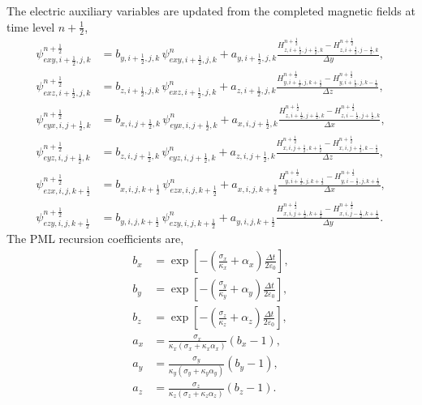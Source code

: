 \documentclass{article}
\numberwithin{equation}{section}
\numberwithin{figure}{section}
\begin{document}
The electric auxiliary variables are updated from the completed magnetic fields at time level $n+\tfrac12$,
\begin{subequations}\label{eq:first-pml-aux-e}
    \begin{align}
        \psi_{exy,i+\tfrac12,j,k}^{n+\frac12} & = b_{y,i+\tfrac12,j,k}\,\psi_{exy,i+\tfrac12,j,k}^{n} +a_{y,i+\tfrac12,j,k} \frac{H_{z,i+\tfrac12,j+\tfrac12,k}^{n+\frac12}-H_{z,i+\tfrac12,j-\tfrac12,k}^{n+\frac12}}{\Delta y}, \\
        \psi_{exz,i+\tfrac12,j,k}^{n+\frac12} & = b_{z,i+\tfrac12,j,k}\,\psi_{exz,i+\tfrac12,j,k}^{n} +a_{z,i+\tfrac12,j,k} \frac{H_{y,i+\tfrac12,j,k+\tfrac12}^{n+\frac12}-H_{y,i+\tfrac12,j,k-\tfrac12}^{n+\frac12}}{\Delta z}, \\
        \psi_{eyx,i,j+\tfrac12,k}^{n+\frac12} & = b_{x,i,j+\tfrac12,k}\,\psi_{eyx,i,j+\tfrac12,k}^{n} +a_{x,i,j+\tfrac12,k} \frac{H_{z,i+\tfrac12,j+\tfrac12,k}^{n+\frac12}-H_{z,i-\tfrac12,j+\tfrac12,k}^{n+\frac12}}{\Delta x}, \\
        \psi_{eyz,i,j+\tfrac12,k}^{n+\frac12} & = b_{z,i,j+\tfrac12,k}\,\psi_{eyz,i,j+\tfrac12,k}^{n} +a_{z,i,j+\tfrac12,k} \frac{H_{x,i,j+\tfrac12,k+\tfrac12}^{n+\frac12}-H_{x,i,j+\tfrac12,k-\tfrac12}^{n+\frac12}}{\Delta z}, \\
        \psi_{ezx,i,j,k+\tfrac12}^{n+\frac12} & = b_{x,i,j,k+\tfrac12}\,\psi_{ezx,i,j,k+\tfrac12}^{n} +a_{x,i,j,k+\tfrac12} \frac{H_{y,i+\tfrac12,j,k+\tfrac12}^{n+\frac12}-H_{y,i-\tfrac12,j,k+\tfrac12}^{n+\frac12}}{\Delta x}, \\
        \psi_{ezy,i,j,k+\tfrac12}^{n+\frac12} & = b_{y,i,j,k+\tfrac12}\,\psi_{ezy,i,j,k+\tfrac12}^{n} +a_{y,i,j,k+\tfrac12} \frac{H_{x,i,j+\tfrac12,k+\tfrac12}^{n+\frac12}-H_{x,i,j-\tfrac12,k+\tfrac12}^{n+\frac12}}{\Delta y}.
    \end{align}
\end{subequations}
The PML recursion coefficients are,
\begin{subequations}\label{eq:first-pml-aux-coefficients}
    \begin{align}
        b_{x} & = \exp\left[-\left(\frac{\sigma_{x}}{\kappa_{x}}+\alpha_{x}\right) \frac{\Delta t}{2\varepsilon_0} \right], \\
        b_{y} & = \exp\left[-\left(\frac{\sigma_{y}}{\kappa_{y}}+\alpha_{y}\right) \frac{\Delta t}{2\varepsilon_0} \right], \\
        b_{z} & = \exp\left[-\left(\frac{\sigma_{z}}{\kappa_{z}}+\alpha_{z}\right) \frac{\Delta t}{2\varepsilon_0} \right], \\
        a_{x} & = \frac{\sigma_{x}} {\kappa_{x}\left(\sigma_{x}+\kappa_{x}\alpha_{x}\right)} \left(b_{x}-1\right),          \\
        a_{y} & = \frac{\sigma_{y}} {\kappa_{y}\left(\sigma_{y}+\kappa_{y}\alpha_{y}\right)} \left(b_{y}-1\right),          \\
        a_{z} & = \frac{\sigma_{z}} {\kappa_{z}\left(\sigma_{z}+\kappa_{z}\alpha_{z}\right)} \left(b_{z}-1\right).
    \end{align}
\end{subequations}
\end{document}
